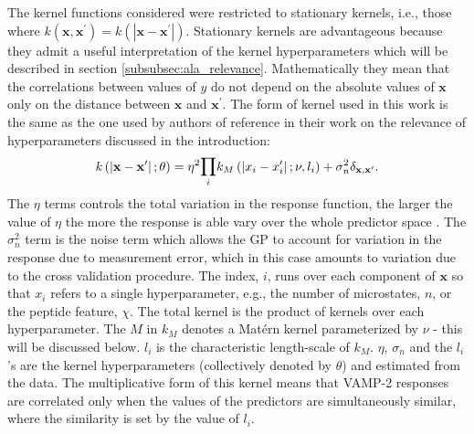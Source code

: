 The kernel functions considered were restricted to stationary kernels, i.e., those where $k(\mathbf{x}, \mathbf{x}^{\prime}) = k(|\mathbf{x} - \mathbf{x}^{\prime}|)$. Stationary kernels are advantageous because they admit a useful interpretation of the kernel hyperparameters which will be described in section \ref{subsubsec:ala_relevance}. Mathematically they mean that the correlations between values of $y$ do not depend on the absolute values of $\mathbf{x}$ only on the distance between $\mathbf{x}$ and $\mathbf{x}^{\prime}$.
The form of kernel used in this work is the same as the one used by authors of reference  \cite{bergstrajamesbergstraRandomSearchHyperParameter2012} in their work on the relevance of hyperparameters discussed in the introduction: 
\begin{equation}\label{eqn:kernel_form}
    k\left(\left|\mathbf{x}-\mathbf{x}^{\prime}\right|; \theta\right) = 
    \eta^{2}\mathlarger{\prod}_i k_{M}\left(\left|x_{i}-x_{i}^{\prime}\right|; \nu, l_i\right)
    +\sigma_{n}^{2}\delta_{\mathbf{x}, \mathbf{x}^{\prime}}. 
\end{equation}
The $\eta$ terms controls the total variation in the response function, the larger the value of $\eta$ the more the response is able vary over the whole predictor space \cite{rasmussenGaussianProcessesMachine2006}. The $\sigma_{n}^{2}$ term is the noise \cite{rasmussenGaussianProcessesMachine2006} term which allows the GP to account for variation in the response due to measurement error, which in this case amounts to variation due to the cross validation procedure.  The index, $i$, runs over each component of $\mathbf{x}$ so that $x_{i}$ refers to a single hyperparameter, e.g., the number of microstates, $n$, or the peptide feature, $\chi$. The total kernel is the product of kernels over each hyperparameter.  The $M$ in $k_{M}$ denotes a Mat\'ern kernel parameterized by $\nu$ - this will be discussed below. $l_{i}$ is the characteristic length-scale of $k_{M}$. $\eta$, $\sigma_{n}$ and the $l_{i}$'s are the kernel hyperparameters (collectively denoted by $\theta$)  and estimated from the data. The multiplicative form of this kernel means that VAMP-2 responses are correlated only when the values of the predictors are simultaneously similar, where the similarity is set by the value of $l_{i}$.    

